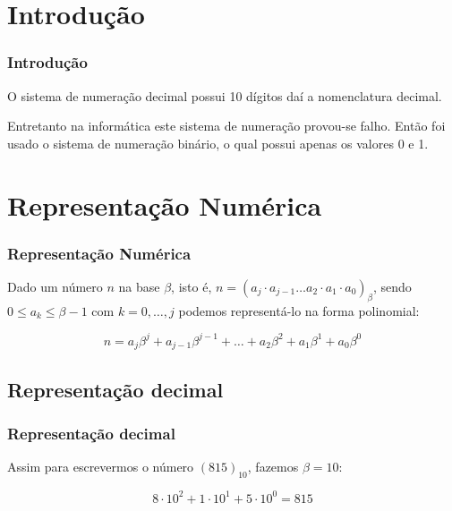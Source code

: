 \begin{frame}\frametitle{}


\end{frame}

\section{Introdução}

\begin{frame}\frametitle{Introdução}

O sistema de numeração decimal possui 10 dígitos daí a nomenclatura
decimal.

Entretanto na informática este sistema de numeração provou-se falho.
Então foi usado o sistema de numeração binário, o qual possui apenas os
valores 0 e 1.

\end{frame}

\begin{frame}\frametitle{}


\end{frame}

\section{Representação Numérica}

\begin{frame}\frametitle{Representação Numérica}

Dado um número $n$ na base $\beta$, isto é,
$n = (a_j \cdot a_{j-1} \dots a_2 \cdot a_1 \cdot a_0)_\beta$, sendo
$0 \le a_k \le \beta-1$ com $k = 0, \dots, j$ podemos representá-lo na
forma polinomial:

\begin{equation}
n = a_j \beta^j + a_{j-1} \beta^{j-1} + \dots + a_2 \beta^2 + a_1 \beta^1 + a_0 \beta^0
\end{equation}

\end{frame}

\subsection{Representação decimal}

\begin{frame}\frametitle{Representação decimal}

Assim para escrevermos o número $(815)_{10}$, fazemos $\beta = 10$:

\begin{equation}
8 \cdot 10^2 + 1 \cdot 10^1 + 5 \cdot 10^0 = 815
\end{equation}

\end{frame}

